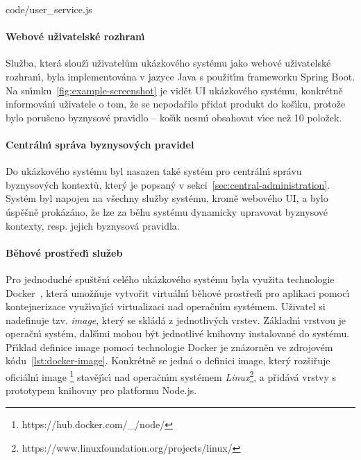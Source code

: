 
{code/user_service.js}

\paragraph{Webové uživatelské rozhran\'{\i}}

Služba, která slouž\'{\i} uživatelům ukázkového systému jako webové uživatelské
rozhran\'{\i}, byla implementována v jazyce Java s použit\'{\i}m frameworku Spring Boot.
Na sn\'{\i}mku~\ref{fig:example-screenshot} je vidět UI ukázkového systému,
konkrétně informován\'{\i} uživatele o tom, že se nepodařilo přidat produkt
do koš\'{\i}ku, protože bylo porušeno byznysové pravidlo – koš\'{\i}k nesm\'{\i} obsahovat
v\'{\i}ce než 10 položek.

\paragraph{Centráln\'{\i} správa byznysov\'ych pravidel}

Do ukázkového systému byl nasazen také systém pro centráln\'{\i} správu byznysov\'ych kontextů,
kter\'y je popsan\'y v sekci~\ref{sec:central-administration}. Systém byl napojen na všechny
služby systému, kromě webového \gls{UI}, a bylo úspěšně prokázáno, že lze za běhu systému
dynamicky upravovat byznysové kontexty, resp. jejich byznysová pravidla.

\paragraph{Běhové prostřed\'{\i} služeb}
Pro jednoduché spuštěn\'{\i} celého ukázkového systému byla využita technologie
Docker~\cite{merkel2014docker}, která umožňuje vytvořit virtuáln\'{\i} běhové prostřed\'{\i}
pro aplikaci pomoc\'{\i} kontejnerizace využ\'{\i}vaj\'{\i}c\'{\i} virtualizaci nad operačn\'{\i}m systémem.
Uživatel si nadefinuje tzv. \textit{image}, kter\'y se skládá z jednotliv\'ych vrstev.
Základn\'{\i} vrstvou je operačn\'{\i} systém, dalš\'{\i}mi mohou b\'yt jednotlivé knihovny instalované do systému.
Př\'{\i}klad definice image pomoc\'{\i} technologie Docker je znázorněn ve zdrojovém
kódu~\ref{lst:docker-image}. Konkrétně se jedná o definici image, kter\'y
rozšiřuje oficiáln\'{\i} image \footnote{https://hub.docker.com/\_/node/}
stavěj\'{\i}c\'{\i} nad operačn\'{\i}m systémem \textit{Linux}\footnote{https://www.linuxfoundation.org/projects/linux/},
a přidává vrstvy s prototypem knihovny pro platformu Node.js.

